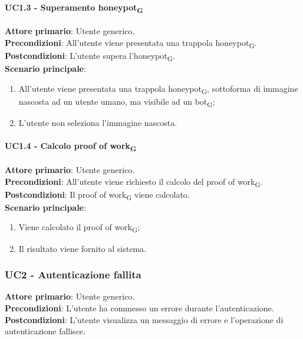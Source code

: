 \paragraph{UC1.3 - Superamento honeypot\textsubscript{G}}
\textbf{Attore primario}: Utente generico.\\
\textbf{Precondizioni}: All'utente viene presentata una trappola honeypot\textsubscript{G}.\\
\textbf{Postcondizioni}: L'utente supera l'honeypot\textsubscript{G}.\\

\textbf{Scenario principale}:
\begin{enumerate}
   \item All'utente viene presentata una trappola honeypot\textsubscript{G}, sottoforma di immagine nascosta ad un utente umano, ma visibile ad un bot\textsubscript{G};
   \item L'utente non seleziona l'immagine nascosta.
\end{enumerate}

\paragraph{UC1.4 - Calcolo proof of work\textsubscript{G}}
\textbf{Attore primario}: Utente generico.\\
\textbf{Precondizioni}: All'utente viene richiesto il calcolo del proof of work\textsubscript{G}.\\
\textbf{Postcondizioni}: Il proof of work\textsubscript{G} viene calcolato.\\

\textbf{Scenario principale}:
\begin{enumerate}
   \item Viene calcolato il proof of work\textsubscript{G};
   \item Il risultato viene fornito al sistema.
\end{enumerate}

\subsubsection{UC2 - Autenticazione fallita}
\textbf{Attore primario}: Utente generico.\\
\textbf{Precondizioni}: L’utente ha commesso un errore durante l'autenticazione.\\
\textbf{Postcondizioni}: L’utente visualizza un messaggio di errore e l’operazione di autenticazione fallisce.\\

